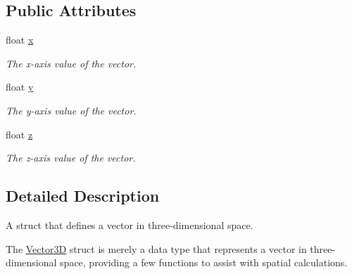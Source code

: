 \subsection*{Public Attributes}
\begin{DoxyCompactItemize}
\item 
float \hyperlink{structtypes_1_1_vector3_d_a67f804e2d8b267b8196415f12a44b517}{x}
\begin{DoxyCompactList}\small\item\em The x-\/axis value of the vector. \end{DoxyCompactList}\item 
float \hyperlink{structtypes_1_1_vector3_d_a02f330a5f3139f9cc3c5aead1728147c}{y}
\begin{DoxyCompactList}\small\item\em The y-\/axis value of the vector. \end{DoxyCompactList}\item 
float \hyperlink{structtypes_1_1_vector3_d_a4266d5bca7826efcfb1fb6454affb51d}{z}
\begin{DoxyCompactList}\small\item\em The z-\/axis value of the vector. \end{DoxyCompactList}\end{DoxyCompactItemize}


\subsection{Detailed Description}
A struct that defines a vector in three-\/dimensional space. 

The \hyperlink{structtypes_1_1_vector3_d}{Vector3\+D} struct is merely a data type that represents a vector in three-\/ dimensional space, providing a few functions to assist with spatial calculations.

